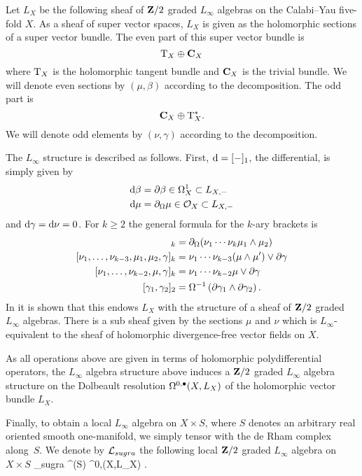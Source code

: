 Let $L_X$ be the following sheaf of $\mathbf{Z}/2$ graded $L_\infty$ algebras on the Calabi--Yau five-fold $X$.
As a sheaf of super vector spaces, $L_X$ is given as the holomorphic sections of a super vector bundle. 
The even part of this super vector bundle is
\[
{\rm T}_X \oplus \mathbf{C}_X 
\]
where ${\rm T}_X$ is the holomorphic tangent bundle and $\mathbf{C}_X$ is the trivial bundle.
We will denote even sections by $(\mu, \beta)$ according to the decomposition. 
The odd part is 
\[
\mathbf{C}_X \oplus {\rm T}^*_X .
\]
We will denote odd elements by $(\nu, \gamma)$ according to the decomposition. 

The $L_\infty$ structure is described as follows. 
First, ${\rm d} = [-]_1$, the differential, is simply given by 
\begin{align*}
{\rm d} \beta & = \partial \beta \in \Omega^1_X \subset L_{X,-} \\
{\rm d} \mu & = \partial_{\Omega} \mu \in \mathcal O_X \subset L_{X, -}
\end{align*}
and ${\rm d} \gamma = {\rm d} \nu = 0$. 
For $k \geq 2$ the general formula for the $k$-ary brackets is 
\begin{align*}
[\nu_1, \ldots, \nu_{k-2}, \mu_1,\mu_2]_{k} & = \div(\nu_1 \cdots \nu_k \mu_1 \wedge \mu_2) \\
[\nu_1,\ldots, \nu_{k-3}, \mu_1,\mu_2,\gamma]_k & = \nu_1 \cdots \nu_{k-3} (\mu \wedge \mu') \vee \del \gamma \\
[\nu_1,\ldots,\nu_{k-2}, \mu, \gamma]_k & = \nu_1 \cdots \nu_{k-2} \mu \vee \del \gamma \\
[\gamma_1,\gamma_2]_2 & = \Omega^{-1} \left(\del \gamma_1 \wedge \del \gamma_2 \right) .
\end{align*}
In \cite{RSW} it is shown that this endows $L_{X}$ with the structure of a sheaf of $\mathbf{Z}/2$ graded $L_\infty$ algebras.
There is a sub sheaf given by the sections $\mu$ and $\nu$ which is $L_\infty$-equivalent to the sheaf of holomorphic divergence-free vector fields on $X$. 

As all operations above are given in terms of holomorphic polydifferential operators, the $L_\infty$ algebra structure above induces a $\mathbf{Z}/2$ graded $L_\infty$ algebra structure on the Dolbeault resolution $\Omega^{0,\bullet}(X,L_X)$ of the holomorphic vector bundle $L_X$.

Finally, to obtain a local $L_\infty$ algebra on $X \times S$, where $S$ denotes an arbitrary real oriented smooth one-manifold, we simply tensor with the de Rham complex along~$S$.
We denote by $\mathcal L_{sugra}$ the following local $\mathbf{Z}/2$ graded $L_\infty$ algebra on $X \times S$
\beqn
\cL_{sugra}  \Omega^\bu(S) \hotimes \Omega^{0,\bu}(X,L_X) .
\eeqn

